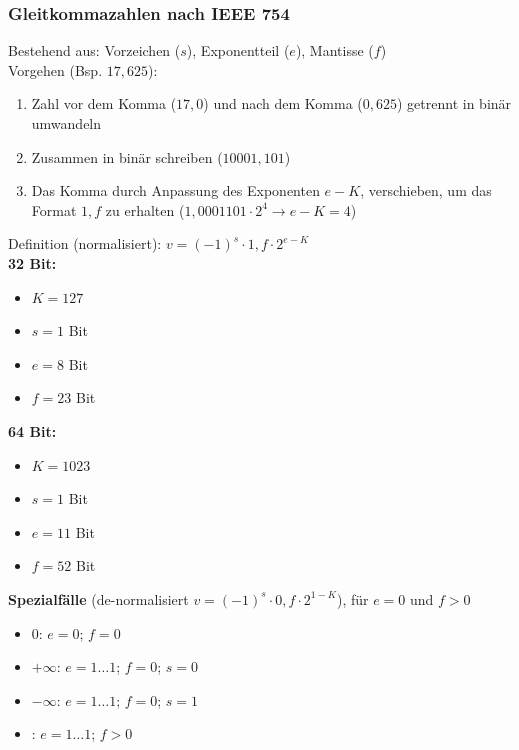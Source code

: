 \documentclass[german, threecolumn, 8pt]{latex4ei/latex4ei_sheet}
\begin{document}
	\subsubsection{Gleitkommazahlen nach IEEE 754}
	Bestehend aus: Vorzeichen ($s$), Exponentteil ($e$), Mantisse ($f$)\\
	Vorgehen (Bsp. $17,625$): 
	\begin{enumerate}
	\item Zahl vor dem Komma ($17,0$) und nach dem Komma ($0,625$) getrennt in binär umwandeln
	\item Zusammen in binär schreiben ($10001,101$)
	\item Das Komma durch Anpassung des Exponenten $e-K$, verschieben, um das Format $1,f$ zu erhalten ($1,0001101 \cdot 2^4 \rightarrow e-K=4$) \\
	\end{enumerate}
\begin{sectionbox}
	Definition (normalisiert): $v=(-1)^s \cdot 1,f \cdot 2^{e-K}$\\
    \textbf{32 Bit:}
        \begin{itemize}\itemsep0pt
            \item $K=127$
            \item $s = 1$ Bit
            \item $e = 8$ Bit
            \item $f = 23$ Bit
        \end{itemize}
    \textbf{64 Bit:}
        \begin{itemize}\itemsep0pt
            \item $K=1023$
            \item $s = 1$ Bit
            \item $e = 11$ Bit
            \item $f = 52$ Bit
        \end{itemize}
	\textbf{Spezialfälle} (de-normalisiert $v=(-1)^s \cdot 0,f \cdot 2^{1-K}$), für $e = 0$ und $f > 0$
	\begin{itemize}\itemsep0pt
	\item 0: $e=0$; $f=0$
	\item $+\infty$: $e=1\dots1$; $f=0$; $s=0$
	\item $-\infty$: $e=1\dots1$; $f=0$; $s=1$
	\item {}: $e=1\dots1$; $f>0$
	\end{itemize}
\end{sectionbox}
\end{document}

